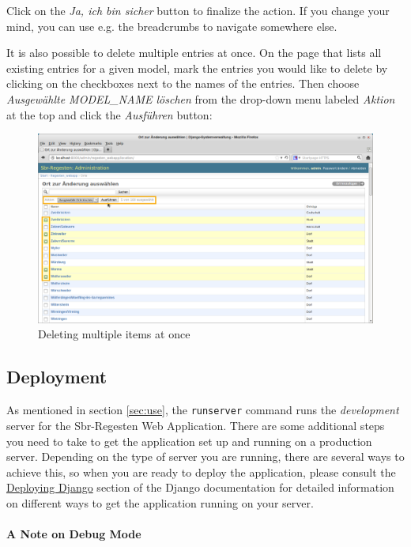 Click on the \emph{Ja, ich bin sicher} button to finalize the action.
If you change your mind, you can use e.g. the breadcrumbs to navigate
somewhere else.

It is also possible to delete multiple entries at once. On the page
that lists all existing entries for a given model, mark the entries
you would like to delete by clicking on the checkboxes next to the
names of the entries. Then choose \emph{Ausgewählte MODEL\_NAME
  löschen} from the drop-down menu labeled \emph{Aktion} at the top
and click the \emph{Ausführen} button:

\begin{figure}[h]
  \centering
  \includegraphics[scale=0.3]{img/delete-multiple}
  \caption{Deleting multiple items at once}
  \label{fig:delete-multiple}
\end{figure}

\subsection{Deployment}
\label{sec:deploy}

As mentioned in section \ref{sec:use}, the \texttt{runserver} command
runs the \emph{development} server for the Sbr-Regesten Web
Application. There are some additional steps you need to take to get
the application set up and running on a production server. Depending
on the type of server you are running, there are several ways to
achieve this, so when you are ready to deploy the application, please
consult the
\href{https://docs.djangoproject.com/en/1.4/howto/deployment/}{Deploying
  Django} section of the Django documentation for detailed information
on different ways to get the application running on your server.

\paragraph{A Note on Debug Mode}

